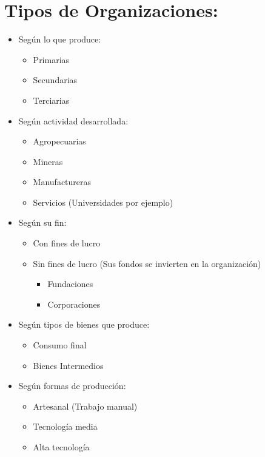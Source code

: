 \documentclass{templateNote}
\begin{document}
\section{Tipos de Organizaciones:}
\begin{itemize}
    \item Según lo que produce:
        \begin{itemize}
            \item Primarias
            \item Secundarias
            \item Terciarias
        \end{itemize}
    \item Según actividad desarrollada:
        \begin{itemize}
            \item Agropecuarias
            \item Mineras
            \item Manufactureras
            \item Servicios (Universidades por ejemplo)
        \end{itemize}
    \item Según su fin:
        \begin{itemize}
            \item Con fines de lucro
            \item Sin fines de lucro (Sus fondos se invierten en la organización)
            \begin{itemize}
                \item Fundaciones
                \item Corporaciones
            \end{itemize}
        \end{itemize}
    \item Según tipos de bienes que produce:
        \begin{itemize}
            \item Consumo final
            \item Bienes Intermedios
        \end{itemize}
    \item Según formas de producción:
        \begin{itemize}
            \item Artesanal (Trabajo manual)
            \item Tecnología media
            \item Alta tecnología
        \end{itemize}

\end{itemize}
\end{document}

